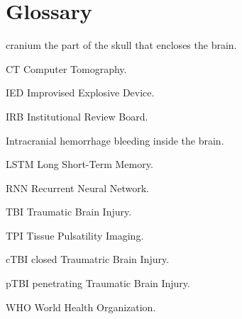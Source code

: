 \documentclass [11pt, proquest] {uwthesis}[2020/02/24]
\begin{document}
 
%
%

\prelimpages
 
%
%


\copyrightpage

\titlepage  

 
%
%

%
%


\setcounter{page}{-1}
 
%
%
\tableofcontents
\listoffigures
 
%
%
\chapter*{Glossary}      %
\thispagestyle{plain}
%
\begin{glossary}

\item[cranium] the part of the skull that encloses the brain.
\item[CT] Computer Tomography.
\item[IED] Improvised Explosive Device.
\item[IRB] Institutional Review Board.
\item[Intracranial hemorrhage] bleeding inside the brain.
\item[LSTM] Long Short-Term Memory. 
\item[RNN] Recurrent Neural Network. 
\item[TBI] Traumatic Brain Injury.
\item[TPI] Tissue Pulsatility Imaging.
\item[cTBI] closed Traumatric Brain Injury.
\item[pTBI] penetrating Traumatic Brain Injury.
\item[WHO] World Health Organization.
 
\end{glossary}
 
\end{document}
